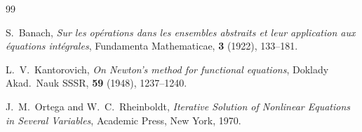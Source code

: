 \documentclass[12pt, a4paper, oneside]{book}
\theoremstyle{plain}
\theoremstyle{definition}
\begin{document}
\lipsum[12]

\backmatter    %

%   
%   

\begin{thebibliography}{99}

    S.~Banach,
    \emph{Sur les op\'{e}rations dans les ensembles abstraits et leur
    application aux \'{e}quations int\'{e}grales},
    Fundamenta Mathematicae, \textbf{3} (1922), 133--181.

    L.~V.~Kantorovich,
    \emph{On Newton's method for functional equations},
    Doklady Akad.\ Nauk SSSR, \textbf{59} (1948), 1237--1240.

    J.~M.~Ortega and W.~C.~Rheinboldt,
    \emph{Iterative Solution of Nonlinear Equations in Several Variables},
    Academic Press, New York, 1970.

\end{thebibliography}
\end{document}
